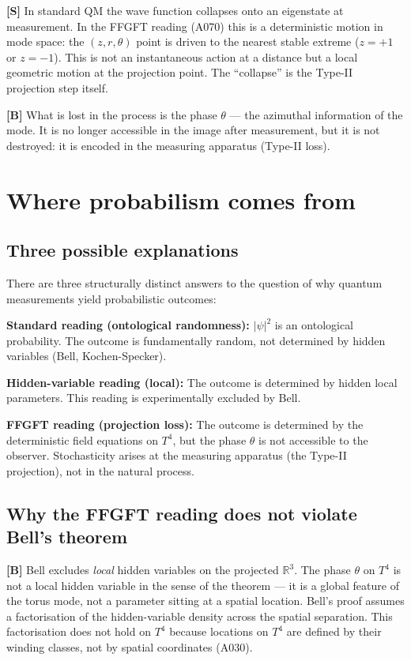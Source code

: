 \textbf{[S]} In standard QM the wave function collapses onto an
eigenstate at measurement. In the FFGFT reading (A070) this is a
deterministic motion in mode space: the $(z,r,\theta)$ point is
driven to the nearest stable extreme ($z=+1$ or $z=-1$). This is
not an instantaneous action at a distance but a local geometric motion
at the projection point. The \enquote{collapse} is the Type-II
projection step itself.

\textbf{[B]} What is lost in the process is the phase $\theta$ ---
the azimuthal information of the mode. It is no longer accessible in
the image after measurement, but it is not destroyed: it is encoded
in the measuring apparatus (Type-II loss).

\section{Where probabilism comes from}

\subsection{Three possible explanations}

There are three structurally distinct answers to the question of why
quantum measurements yield probabilistic outcomes:

\textbf{Standard reading (ontological randomness):} $|\psi|^2$ is an
ontological probability. The outcome is fundamentally random, not
determined by hidden variables (Bell, Kochen-Specker).

\textbf{Hidden-variable reading (local):} The outcome is determined
by hidden local parameters. This reading is experimentally excluded by Bell.

\textbf{FFGFT reading (projection loss):} The outcome is determined by
the deterministic field equations on $T^4$, but the phase $\theta$ is
not accessible to the observer. Stochasticity arises at the measuring
apparatus (the Type-II projection), not in the natural process.

\subsection{Why the FFGFT reading does not violate Bell's theorem}

\textbf{[B]} Bell excludes \emph{local} hidden variables on the projected
$\mathbb{R}^3$. The phase $\theta$ on $T^4$ is not a local hidden
variable in the sense of the theorem --- it is a global feature of the
torus mode, not a parameter sitting at a spatial location. Bell's proof
assumes a factorisation of the hidden-variable density across the spatial
separation. This factorisation does not hold on $T^4$ because locations
on $T^4$ are defined by their winding classes, not by spatial coordinates
(A030).

